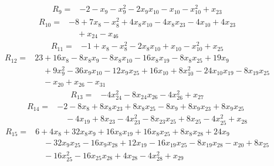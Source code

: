 \begin{equation*}\begin{split}
R_{9}={}&-2 - x_{9} - x_{9}^{2} - 2x_{9} x_{10} - x_{10} - x_{10}^{2} + x_{23}
\end{split}\end{equation*}
\begin{equation*}\begin{split}
R_{10}={}&-8 + 7x_{8} - x_{8}^{2} + 4x_{8} x_{10} - 4x_{8} x_{23} - 4x_{10} + 4x_{23}\\
&\quad + x_{24} - x_{46}
\end{split}\end{equation*}
\begin{equation*}\begin{split}
R_{11}={}&-1 + x_{8} - x_{8}^{2} - 2x_{8} x_{10} + x_{10} - x_{10}^{2} + x_{25}
\end{split}\end{equation*}
\begin{equation*}\begin{split}
R_{12}={}&23 + 16x_{8} - 8x_{8} x_{9} - 8x_{8} x_{10} - 16x_{8} x_{19} - 8x_{8} x_{25} + 19x_{9}\\
&\quad + 9x_{9}^{2} - 36x_{9} x_{10} - 12x_{9} x_{25} + 16x_{10} + 8x_{10}^{2} - 24x_{10} x_{19} - 8x_{19} x_{25}\\
&\quad -x_{20} + x_{26} - x_{31}
\end{split}\end{equation*}
\begin{equation*}\begin{split}
R_{13}={}&-4x_{24}^{2} - 8x_{24} x_{26} - 4x_{26}^{2} + x_{27}
\end{split}\end{equation*}
\begin{equation*}\begin{split}
R_{14}={}&-2 - 8x_{8} + 8x_{8} x_{23} + 8x_{8} x_{25} - 8x_{9} + 8x_{9} x_{23} + 8x_{9} x_{25}\\
&\quad -4x_{19} + 8x_{23} - 4x_{23}^{2} - 8x_{23} x_{25} + 8x_{25} - 4x_{25}^{2} + x_{28}
\end{split}\end{equation*}
\begin{equation*}\begin{split}
R_{15}={}&6 + 4x_{8} + 32x_{8} x_{9} + 16x_{8} x_{19} + 16x_{8} x_{25} + 8x_{8} x_{28} + 24x_{9}\\
&\quad -32x_{9} x_{25} - 16x_{9} x_{28} + 12x_{19} - 16x_{19} x_{25} - 8x_{19} x_{28} - x_{20} + 8x_{25}\\
&\quad -16x_{25}^{2} - 16x_{25} x_{28} + 4x_{28} - 4x_{28}^{2} + x_{29}
\end{split}\end{equation*}
